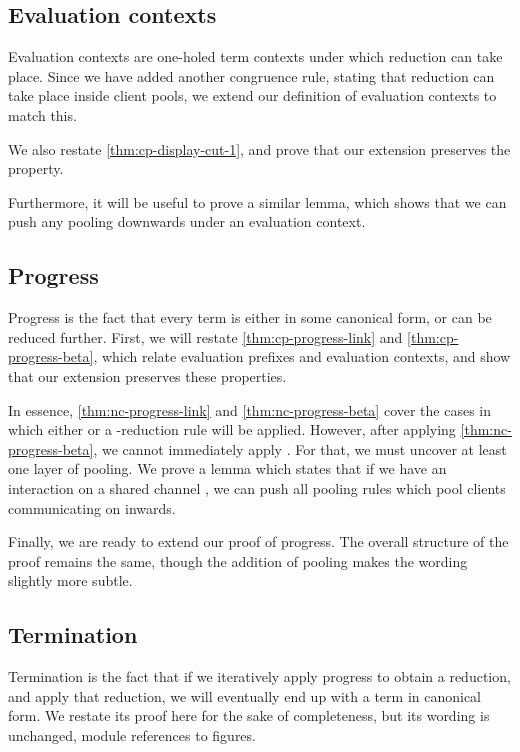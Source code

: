 \subsection{Evaluation contexts}
Evaluation contexts are one-holed term contexts under which reduction can take
place. Since we have added another congruence rule, stating that reduction can
take place inside client pools, we extend our definition of evaluation contexts
to match this.

We also restate \cref{thm:cp-display-cut-1}, and prove that our extension
preserves the property.

Furthermore, it will be useful to prove a similar lemma, which shows that we can
push any pooling downwards under an evaluation context.


\subsection{Progress}
Progress is the fact that every term is either in some canonical form, or can be
reduced further.
First, we will restate \cref{thm:cp-progress-link} and \cref{thm:cp-progress-beta},
which relate evaluation prefixes and evaluation contexts, and show that our
extension preserves these properties. 


In essence, \cref{thm:nc-progress-link} and \cref{thm:nc-progress-beta} cover
the cases in which either  or a \textbeta-reduction rule will be
applied.
However, after applying \cref{thm:nc-progress-beta}, we cannot immediately apply
. For that, we must uncover at least one layer of pooling.
We prove a lemma which states that if we have an interaction on a shared channel
, we can push all pooling rules which pool clients communicating on 
inwards. 

Finally, we are ready to extend our proof of progress. The overall structure of
the proof remains the same, though the addition of pooling makes the wording
slightly more subtle.


\subsection{Termination}
Termination is the fact that if we iteratively apply progress to obtain a
reduction, and apply that reduction, we will eventually end up with a term in
canonical form.
We restate its proof here for the sake of completeness, but its wording is
unchanged, module references to figures.


